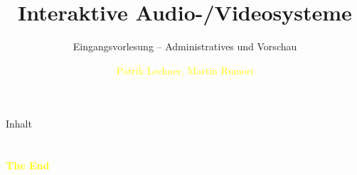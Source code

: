 \documentclass[aspectratio=43]{beamer}
\title{Interaktive Audio-/Videosysteme} %
\subtitle{Eingangsvorlesung -- Administratives und Vorschau}
\author[Lechner/Rumori]{\textcolor{yellow}{Patrik Lechner, Martin Rumori}}
\institute[IC\textbackslash M/T]{
    \\%
    \textcolor{white}{FH St.Pölten}%
} %
\begin{document}
    
    \frame{\titlepage}
    
    \begin{frame}{Inhalt}
        \tableofcontents
    \end{frame}
        
    
    
    
    
    
    
    
    
    

    \section{}
    \begin{frame}{}
        \centering
            \Huge\bfseries
        \textcolor{yellow}{The End}
    \end{frame}
\end{document}
